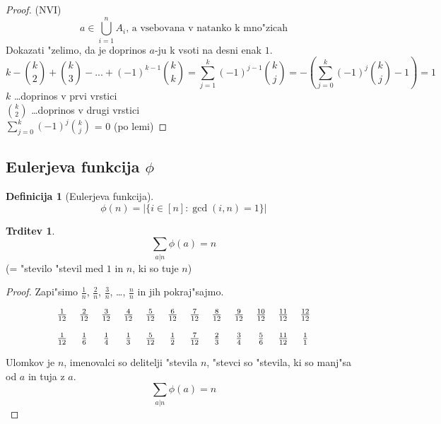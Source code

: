 \documentclass[a4paper,12pt]{article}
\theoremstyle{definition}
\newtheorem{defn}[counter]{Definicija}
\newtheorem{claim}[counter]{Trditev}
\theoremstyle{remark}
\begin{document}
\begin{proof}(NVI)
	\label{TODO: tega ne bom gledu}
	\[a \in \bigcup_{i = 1}^{n} A_i \text{, a vsebovana v natanko k mno"zicah}\]
	Dokazati "zelimo, da je doprinos $a$-ju k vsoti na desni enak $1$.
	\[k - \binom{k}{2} + \binom{k}{3} - ... + (-1)^{k-1} \binom{k}{k} = \sum_{j = 1}^{k} (-1)^{j - 1} \binom{k}{j} = - (\sum_{j = 0}^{k} (-1)^j \binom{k}{j} - 1) = 1\]
	$k$ \ldots doprinos v prvi vrstici\\
	$\binom{k}{2}$ \ldots doprinos v drugi vrstici\\
	$\displaystyle \sum_{j = 0}^{k} (-1)^j \binom{k}{j}$ = 0 (po lemi)
\end{proof}

\subsection{Eulerjeva funkcija $\phi$} %
\begin{defn}[Eulerjeva funkcija]
	\[\phi (n) = |\{i \in [n] : \gcd(i, n) = 1\}|\]
\end{defn}

\begin{claim}
	\[\sum_{a | n} \phi (a) = n\]
	(= "stevilo "stevil med $1$ in $n$, ki so tuje $n$)
\end{claim}

\begin{proof}
	Zapi"simo $\frac{1}{n}$, $\frac{2}{n}$, $\frac{3}{n}$, \ldots, $\frac{n}{n}$ in jih pokraj"sajmo.

	\[
	\begin{tabular}{c c c c c c c c c c c c}

	$\frac{1}{12}$ & $\frac{2}{12}$ & $\frac{3}{12}$ & $\frac{4}{12}$ & $\frac{5}{12}$ & $\frac{6}{12}$ & $\frac{7}{12}$ & $\frac{8}{12}$ & $\frac{9}{12}$ & $\frac{10}{12}$ & $\frac{11}{12}$ & $\frac{12}{12}$\\
	\\
	$\frac{1}{12}$ & $\frac{1}{6}$ & $\frac{1}{4}$ & $\frac{1}{3}$ & $\frac{5}{12}$ & $\frac{1}{2}$ & $\frac{7}{12}$ & $\frac{2}{3}$ & $\frac{3}{4}$ & $\frac{5}{6}$ & $\frac{11}{12}$ & $\frac{1}{1}$

	\end{tabular}
	\]

	Ulomkov je $n$, imenovalci so delitelji "stevila $n$, "stevci so "stevila, ki so manj"sa od $a$ in tuja z $a$.
	\[\sum_{a | n} \phi (a) = n\]
\end{proof}
\end{document}
